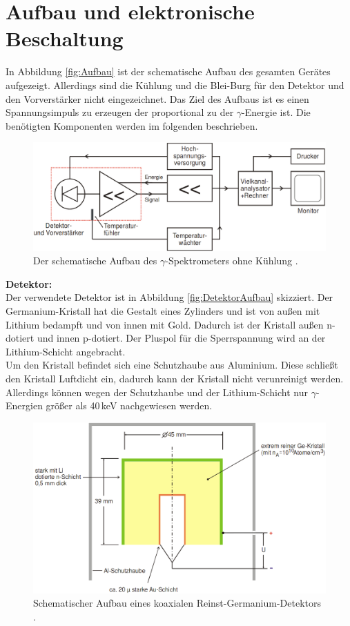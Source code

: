 \section{Aufbau und elektronische Beschaltung}
In Abbildung \eqref{fig:Aufbau} ist der schematische Aufbau des gesamten Gerätes aufgezeigt. Allerdings sind die Kühlung und die Blei-Burg für den Detektor und den Vorverstärker nicht eingezeichnet. Das Ziel des Aufbaus ist es einen Spannungsimpuls zu erzeugen der proportional zu der $\gamma$-Energie ist. Die benötigten Komponenten werden im folgenden beschrieben.

\begin{figure}[H]
  \centering
  \includegraphics[width=\linewidth]{Bilder/Aufbau.png}
  \caption{Der schematische Aufbau des $\gamma$-Spektrometers ohne Kühlung \cite{V18}.}
  \label{fig:Aufbau}
\end{figure}

\textbf{Detektor:} \\
Der verwendete Detektor ist in Abbildung \eqref{fig:DetektorAufbau} skizziert. Der Germanium-Kristall hat die Gestalt eines Zylinders und ist von außen mit Lithium bedampft und von innen mit Gold. Dadurch ist der Kristall außen n-dotiert und innen p-dotiert. Der Pluspol für die Sperrspannung wird an der Lithium-Schicht angebracht. \\
Um den Kristall befindet sich eine Schutzhaube aus Aluminium. Diese schließt den Kristall Luftdicht ein, dadurch kann der Kristall nicht verunreinigt werden. Allerdings können wegen der Schutzhaube und der Lithium-Schicht nur $\gamma$-Energien größer als 40\,keV nachgewiesen werden.

\begin{figure}[H]
  \centering
  \includegraphics[width=0.9\linewidth]{Bilder/Germanium-Detektor.png}
  \caption{Schematischer Aufbau eines koaxialen Reinst-Germanium-Detektors \cite{V18}.}
  \label{fig:DetektorAufbau}
\end{figure}


